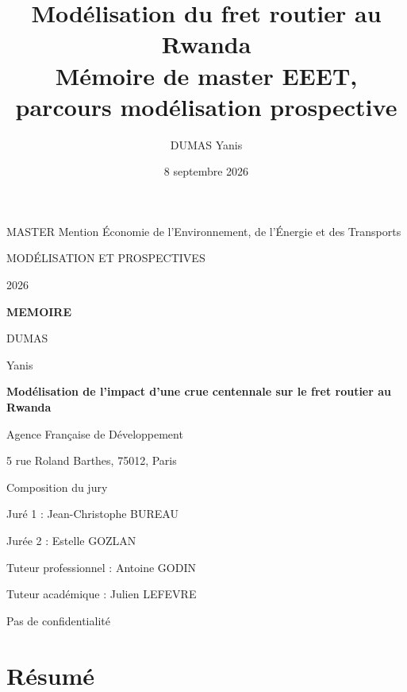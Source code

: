 \documentclass[12pt,a4paper,french]{report}
\title{Modélisation du fret routier au Rwanda \\[0.5em]
	\large Mémoire de master EEET, parcours modélisation prospective}
\author{DUMAS Yanis}
\date{8 septembre 2026}
\begin{document}
	\begin{titlepage}
		\centering
		\vspace*{1cm}
		{\large MASTER Mention Économie de l'Environnement, de l'Énergie et des Transports\par}
		\vspace{0.3cm}
		{\large MODÉLISATION ET PROSPECTIVES\par}
		\vspace{0.3cm}
		{\large 2026\par}

		\vspace{2cm}
		{\Large\bfseries MEMOIRE\par}

		\vspace{2cm}
		{\large DUMAS\par}
		{\large Yanis\par}

		\vspace{2cm}
		{\Large\bfseries Modélisation de l'impact d'une crue centennale sur le fret routier au Rwanda\par}

		\vspace{2cm}
		{\large Agence Française de Développement\par}
		{\large 5 rue Roland Barthes, 75012, Paris\par}

		\vspace{2cm}
		{\large Composition du jury\par}
		\vspace{0.3cm}
		{\large Juré 1 : Jean-Christophe BUREAU\par}
		{\large Jurée 2 : Estelle GOZLAN\par}
		{\large Tuteur professionnel : Antoine GODIN\par}
		{\large Tuteur académique : Julien LEFEVRE\par}

		\vfill
		{\large Pas de confidentialité\par}
		\vspace*{1cm}
	\end{titlepage}
	
	\newpage
	
	\chapter{Résumé}
	
\end{document}
